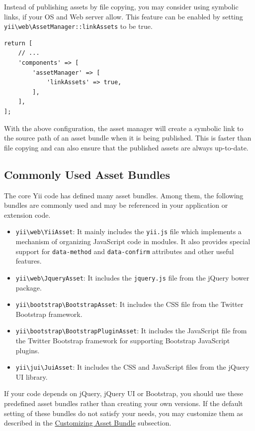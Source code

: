Instead of publishing assets by file copying, you may consider using symbolic links, if your OS and Web server allow.
This feature can be enabled by setting \texttt{yii{\allowbreak{}\textbackslash}web{\allowbreak{}\textbackslash}AssetManager\allowbreak{}::\allowbreak{}linkAssets} to be true.

\lstset{language=php}\begin{lstlisting}
return [
    // ...
    'components' => [
        'assetManager' => [
            'linkAssets' => true,
        ],
    ],
];
\end{lstlisting}
With the above configuration, the asset manager will create a symbolic link to the source path of an asset bundle
when it is being published. This is faster than file copying and can also ensure that the published assets are
always up-to-date.

\subsection{Commonly Used Asset Bundles \label{structure-assets.md::common-asset-bundles}}
The core Yii code has defined many asset bundles. Among them, the following bundles are commonly used and may
be referenced in your application or extension code.

\begin{itemize}
\item \texttt{yii{\allowbreak{}\textbackslash}web{\allowbreak{}\textbackslash}YiiAsset}: It mainly includes the \lstinline|yii.js| file which implements a mechanism of organizing JavaScript code
in modules. It also provides special support for \lstinline|data-method| and \lstinline|data-confirm| attributes and other useful features.
\item \texttt{yii{\allowbreak{}\textbackslash}web{\allowbreak{}\textbackslash}JqueryAsset}: It includes the \lstinline|jquery.js| file from the jQuery bower package.
\item \texttt{yii{\allowbreak{}\textbackslash}bootstrap{\allowbreak{}\textbackslash}BootstrapAsset}: It includes the CSS file from the Twitter Bootstrap framework.
\item \texttt{yii{\allowbreak{}\textbackslash}bootstrap{\allowbreak{}\textbackslash}BootstrapPluginAsset}: It includes the JavaScript file from the Twitter Bootstrap framework for
supporting Bootstrap JavaScript plugins.
\item \texttt{yii{\allowbreak{}\textbackslash}jui{\allowbreak{}\textbackslash}JuiAsset}: It includes the CSS and JavaScript files from the jQuery UI library.
\end{itemize}
If your code depends on jQuery, jQuery UI or Bootstrap, you should use these predefined asset bundles rather than
creating your own versions. If the default setting of these bundles do not satisfy your needs, you may customize them 
as described in the \hyperref[structure-assets.md::::customizing-asset-bundles]{Customizing Asset Bundle} subsection. 

